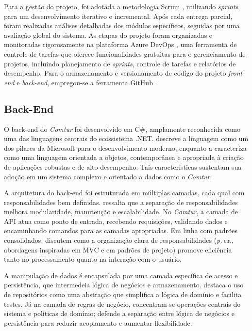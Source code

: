 Para a gestão do projeto, foi adotada a metodologia Scrum \parencite{Sutherland2019Scrum}, utilizando \textit{sprints} para um desenvolvimento iterativo e incremental. Após cada entrega parcial, foram realizadas análises detalhadas dos módulos específicos, seguidas por uma avaliação global do sistema. As etapas do projeto foram organizadas e monitoradas rigorosamente na plataforma Azure DevOps \parencite{Microsoft2024AzureDevOps}, uma ferramenta de controle de tarefas que oferece funcionalidades gratuitas para o gerenciamento de projetos, incluindo planejamento de \textit{sprints}, controle de tarefas e relatórios de desempenho. Para o armazenamento e versionamento de código do projeto \textit{front-end} e \textit{back-end}, empregou-se a ferramenta GitHub \parencite{GitHub2024}.

\subsection{Back-End}

O back-end do \textit{Comtur} foi desenvolvido em C\#, amplamente reconhecida como uma das
linguagens centrais do ecossistema .NET. \textcite{Schildt2009} descreve a linguagem como
um dos pilares da Microsoft para o desenvolvimento moderno, enquanto \textcite{Skeet2019}
a caracteriza como uma linguagem orientada a objetos, contemporânea e apropriada à criação
de aplicações robustas e de alto desempenho. Tais características sustentam sua adoção em
um sistema complexo e orientado a dados como o \textit{Comtur}.

A arquitetura do back-end foi estruturada em múltiplas camadas, cada qual com
responsabilidades bem definidas. \textcite{Fowler2012} ressalta que a separação de
responsabilidades melhora modularidade, manutenção e escalabilidade. No \textit{Comtur},
a camada de API atua como ponto de entrada, recebendo requisições, validando dados e
encaminhando comandos para as camadas apropriadas. Em linha com padrões consolidados,
\textcite{FreemanRobson2020} discutem como a organização clara de responsabilidades
(\textit{p.\,ex.}, abordagens inspiradas em MVC e em padrões de projeto) promove eficiência
tanto no processamento quanto na interação com o usuário.

A manipulação de dados é encapsulada por uma camada específica de acesso e persistência,
que intermedeia lógica de negócios e armazenamento. \textcite{Evans2004} destaca o uso de
repositórios como uma abstração que simplifica a lógica de domínio e facilita testes. Já
na camada de regras de negócio, concentram-se operações centrais do sistema e políticas
de domínio; \textcite{Martin2020CleanArchPT} defende a separação entre lógica de negócios e
persistência para reduzir acoplamento e aumentar flexibilidade.

